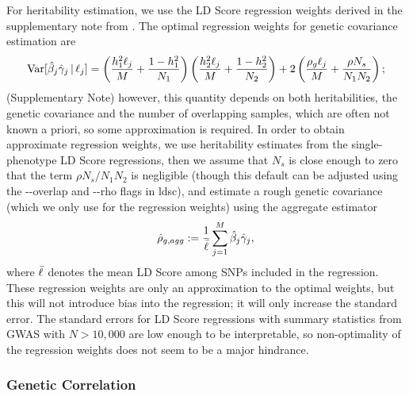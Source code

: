 \documentclass[11pt]{article}
\numberwithin{equation}{section}
\begin{document}
For heritability estimation, we use the LD Score regression weights derived in the 
supplementary note from \cite{buliksullivan2014}. 
The optimal regression weights for genetic covariance estimation are 
$$ \mathrm{Var}[\hat{\beta}_j\hat{\gamma}_j \,|\, \ell_j ] = 
	\left( 
		\frac{h_{1}^2\ell_j}{M} 
		+ 
		\frac{1-h_{1}^2}{N_1} 
	\right) \left(  
		\frac{h_{2}^2\ell_j}{M} 
		+ 
		\frac{1-h_{2}^2}{N_2}
	\right) 
	+ 					
	2\left( 
		\frac{\rho_g\ell_j}{M} 
		+ 
		\frac{\rho N_s}{N_1N_2} 
	\right);
$$
(Supplementary Note) however, this quantity depends on both heritabilities, 
the genetic covariance and the number of overlapping samples,
which are often not known a priori, so some approximation is required.
In order to obtain approximate regression weights, 
we use heritability estimates from the single-phenotype LD Score regressions, then
we assume that $N_s$ is close enough to zero that the term $\rho N_s/N_1N_2$ is negligible
(though this default can be adjusted using the {-}{-}overlap and {-}{-}rho flags in ldsc),
and estimate a rough genetic covariance (which we only use for the regression weights)
using the aggregate estimator 
$$\hat{\rho}_{g, agg} := \frac{1}{\bar{\ell}}\sum_{j=1}^M \hat{\beta}_j\hat{\gamma}_j,$$
where $\bar{\ell}$ denotes the mean LD Score among SNPs included in the regression.
These regression weights are only an approximation to the optimal weights,
but this will not introduce bias into the regression;
it will only increase the standard error. 
The standard errors for LD Score regressions with summary statistics 
from GWAS with $N > 10,000$ are low enough to be interpretable,
so non-optimality of the regression weights does not seem to be a major hindrance.

\subsubsection{Genetic Correlation}
\end{document}
